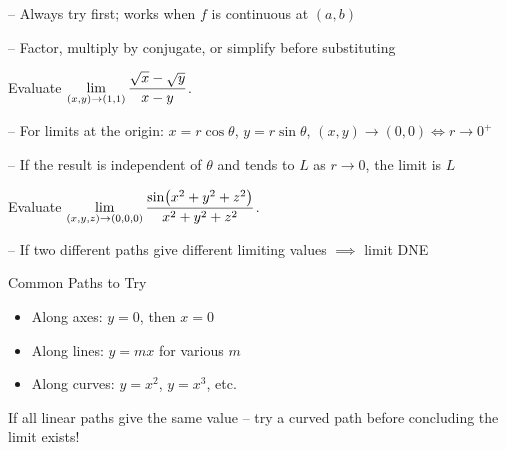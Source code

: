 \documentclass[11pt]{article}
\begin{document}

-- Always try first; works when $f$ is continuous at $(a,b)$


-- Factor, multiply by conjugate, or simplify before substituting

\begin{example}[Rationalization]
Evaluate $\displaystyle\lim_{(x,y)\to(1,1)} \frac{\sqrt{x} - \sqrt{y}}{x - y}$.

\end{example}


-- For limits at the origin: $x = r\cos\theta$, $y = r\sin\theta$, $(x,y)\to(0,0) \iff r\to 0^+$

-- If the result is independent of $\theta$ and tends to $L$ as $r\to 0$, the limit is $L$

\begin{example}
Evaluate $\displaystyle\lim_{(x,y,z)\to(0,0,0)} \frac{\sin(x^2+y^2+z^2)}{x^2+y^2+z^2}$.

\end{example}


-- If two different paths give different limiting values $\implies$ limit DNE

\begin{formulabox}{Common Paths to Try}
\begin{itemize}[nosep, leftmargin=*]
  \item Along axes: $y = 0$, then $x = 0$
  \item Along lines: $y = mx$ for various $m$
  \item Along curves: $y = x^2$, $y = x^3$, etc.
\end{itemize}
If all linear paths give the same value -- try a curved path before concluding the limit exists!
\end{formulabox}
\end{document}
